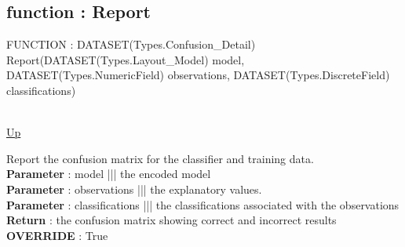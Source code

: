 \subsection*{function : Report}
\hypertarget{ecldoc:logisticregression.binomiallogisticregression.report}{FUNCTION : DATASET(Types.Confusion\_Detail) Report(DATASET(Types.Layout\_Model) model, DATASET(Types.NumericField) observations, DATASET(Types.DiscreteField) classifications)} \\
\hyperlink{ecldoc:logisticregression.binomiallogisticregression}{Up} \\
\par
Report the confusion matrix for the classifier and training data. \\
\textbf{Parameter} : model ||| the encoded model \\
\textbf{Parameter} : observations ||| the explanatory values. \\
\textbf{Parameter} : classifications ||| the classifications associated with the observations \\
\textbf{Return} : the confusion matrix showing correct and incorrect results \\
\textbf{OVERRIDE} : True \\

